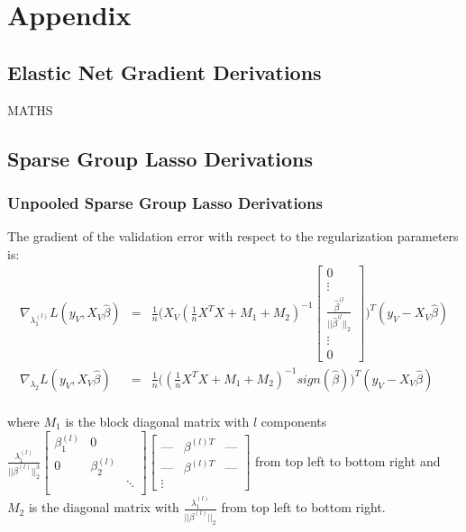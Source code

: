 \documentclass[10pt,letterpaper]{article}
\begin{document}
\section*{Appendix}

\subsection{Elastic Net Gradient Derivations}
MATHS

\subsection{Sparse Group Lasso Derivations}

\subsubsection{Unpooled Sparse Group Lasso Derivations}
The gradient of the validation error with respect to the regularization parameters is:
\begin{equation}
\begin{array}{lcl}
\nabla_{\lambda_1^{(l)}} L(y_V, X_V \hat \beta) &=& 
\frac{1}{n}
\Bigg (
X_V
(\frac{1}{n} X^T X + M_1 + M_2)^{-1}
\begin{bmatrix}
0 \\
\vdots \\
\frac{\hat\beta^{(l}}{||\hat\beta^{(l}||_2}\\
\vdots\\
0
\end{bmatrix}
\Bigg )^T
(y_V - X_V \hat \beta)
 \\
\nabla_{\lambda_2} L(y_V, X_V \hat \beta) &=&
\frac{1}{n}
\Bigg (
(\frac{1}{n} X^T X + M_1 + M_2)^{-1} sign(\hat \beta)
\Bigg )^T
(y_V - X_V \hat \beta)
\\ 
\end{array}
\end{equation}

where $M_1$ is the block diagonal matrix with $l$ components 
$
\frac{\lambda_1^{(l)}}{|| \beta^{(l)}||_2^3}
\begin{bmatrix} 
\beta_1^{(l)} & 0 & \\
0 & \beta_2^{(l)} &  \\
 &  & \ddots \\
\end{bmatrix}
\begin{bmatrix}
\text{---} & \beta^{(l)T} & \text{---} \\
\text{---} & \beta^{(l)T} & \text{---} \\
\vdots
\end{bmatrix}
$ from top left to bottom right and $M_2$ is the diagonal matrix with $\frac{\lambda_1^{(l)}}{|| \beta^{(l)}||_2}$ from top left to bottom right.
\end{document}
